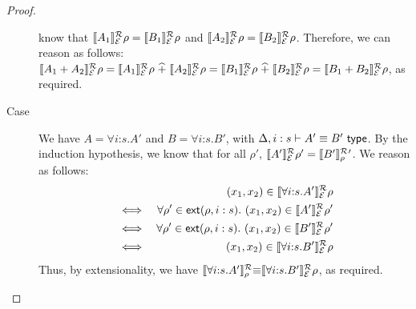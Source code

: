 \begin{proof}
\begin{description}
    know that $\llbracket A_1 \rrbracket^{\mathcal{R}}_{\mathcal{E}}{\rho} =
    \llbracket B_1 \rrbracket^{\mathcal{R}}_{\mathcal{E}}{\rho}$ and $\llbracket A_2 \rrbracket^{\mathcal{R}}_{\mathcal{E}}{\rho} =
    \llbracket B_2 \rrbracket^{\mathcal{R}}_{\mathcal{E}}{\rho}$. Therefore, we can reason as follows:
    $\llbracket A_1 + A_2 \rrbracket^{\mathcal{R}}_{\mathcal{E}}{\rho} = \llbracket A_1 \rrbracket^{\mathcal{R}}_{\mathcal{E}}{\rho}
    \mathrel{\widehat+} \llbracket A_2 \rrbracket^{\mathcal{R}}_{\mathcal{E}}{\rho} = \llbracket B_1 \rrbracket^{\mathcal{R}}_{\mathcal{E}}{\rho}
    \mathrel{\widehat+} \llbracket B_2 \rrbracket^{\mathcal{R}}_{\mathcal{E}}{\rho} = \llbracket B_1 +
      B_2 \rrbracket^{\mathcal{R}}_{\mathcal{E}}{\rho}$, as required.
  \item[Case \TirName{TyEqForall}] We have $A = \forall
    i\mathord:s. A'$ and $B = \forall i\mathord:s.B'$, with $\Delta, i
    : s \vdash A' \equiv B' \textsf{ type}$. By the induction hypothesis,
    we know that for all $\rho'$, $\llbracket A' \rrbracket^{\mathcal{R}}_{\mathcal{E}}{\rho}' =
    \llbracket B' \rrbracket^{\mathcal{R}}_{\rho}{'}$. We reason as follows:
    \begin{eqnarray*}
      &    & (x_1,x_2) \in \llbracket \forall i\mathord:s. A' \rrbracket^{\mathcal{R}}_{\mathcal{E}}{\rho} \\
      &\iff& \forall \rho' \in \mathsf{ext}(\rho,i:s).\ (x_1,x_2) \in \llbracket A' \rrbracket^{\mathcal{R}}_{\mathcal{E}}{\rho}' \\
      &\iff& \forall \rho' \in \mathsf{ext}(\rho,i:s).\ (x_1,x_2) \in \llbracket B' \rrbracket^{\mathcal{R}}_{\mathcal{E}}{\rho}' \\
      &\iff& (x_1,x_2) \in \llbracket \forall i\mathord:s. B' \rrbracket^{\mathcal{R}}_{\mathcal{E}}{\rho}
    \end{eqnarray*}
    Thus, by extensionality, we have $\llbracket \forall
      i\mathord:s.A' \rrbracket^{\mathcal{R}}_{\rho}{\equiv} \llbracket \forall
      i\mathord:s.B' \rrbracket^{\mathcal{R}}_{\mathcal{E}}{\rho}$, as required.
  \end{description}
\end{proof}

